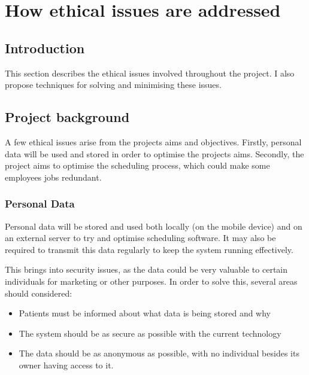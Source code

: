 
\chapter{How ethical issues are addressed} %

\label{AppendixA} %


\section{Introduction}

This section describes the ethical issues involved throughout the project. I also propose techniques for solving and minimising these issues.

\section{Project background}

A few ethical issues arise from the projects aims and objectives. Firstly, personal data will be used and stored in order to optimise the projects aims. Secondly, the project aims to optimise the scheduling process, which could make some employees jobs redundant.

\subsection{Personal Data}

Personal data will be stored and used both locally (on the mobile device) and on an external server to try and optimise scheduling software. It may also be required to transmit this data regularly to keep the system running effectively.

This brings into security issues, as the data could be very valuable to certain individuals for marketing or other purposes. In order to solve this, several areas should considered:

\begin{itemize}
	\item Patients must be informed about what data is being stored and why
	\item The system should be as secure as possible with the current technology
	\item The data should be as anonymous as possible, with no individual besides its owner having access to it.
\end{itemize}

